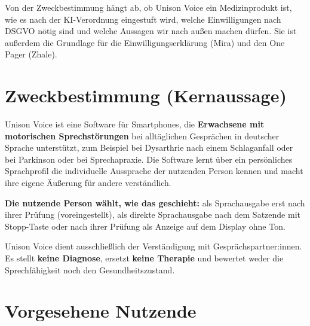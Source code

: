\documentclass[a4paper]{article}
\begin{document}
Von der Zweckbestimmung hängt ab, ob Unison Voice ein Medizinprodukt ist, wie es nach der KI-Verordnung eingestuft wird, welche Einwilligungen nach DSGVO nötig sind und welche Aussagen wir nach außen machen dürfen. Sie ist außerdem die Grundlage für die Einwilligungserklärung (Mira) und den One Pager (Zhale).

\section{Zweckbestimmung (Kernaussage)}

\begin{uvcore}
Unison Voice ist eine Software für Smartphones, die \textbf{Erwachsene mit motorischen Sprechstörungen} bei alltäglichen Gesprächen in deutscher Sprache unterstützt, zum Beispiel bei Dysarthrie nach einem Schlaganfall oder bei Parkinson oder bei Sprechapraxie. Die Software lernt über ein persönliches Sprachprofil die individuelle Aussprache der nutzenden Person kennen und macht ihre eigene Äußerung für andere verständlich.

\textbf{Die nutzende Person wählt, wie das geschieht:} als Sprachausgabe erst nach ihrer Prüfung (voreingestellt), als direkte Sprachausgabe nach dem Satzende mit Stopp-Taste oder nach ihrer Prüfung als Anzeige auf dem Display ohne Ton.

Unison Voice dient ausschließlich der Verständigung mit Gesprächspartner:innen. Es stellt \textbf{keine Diagnose}, ersetzt \textbf{keine Therapie} und bewertet weder die Sprechfähigkeit noch den Gesundheitszustand.
\end{uvcore}

\section{Vorgesehene Nutzende}
\end{document}
